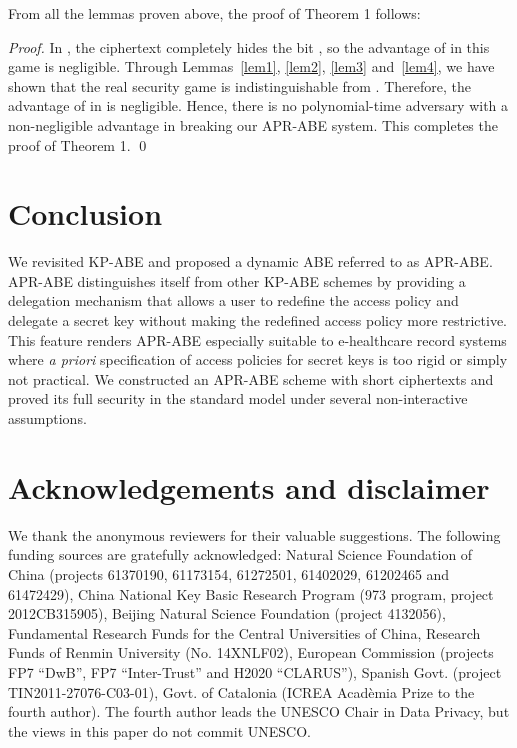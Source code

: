 \documentclass[twocolumn]{svjour3}          \smartqed  \usepackage{graphicx}
\begin{document}
From all the lemmas proven above, the proof of Theorem 1 follows:
\begin{proof}
In , the ciphertext completely hides the bit , so the advantage of  in this game is negligible. 
Through Lemmas~\ref{lem1}, \ref{lem2}, \ref{lem3} and~\ref{lem4},
we have shown that the real security game  is indistinguishable from . Therefore, the advantage of
 in  is negligible. Hence, there is no polynomial-time adversary with a non-negligible advantage in breaking our
APR-ABE system. This completes the proof of Theorem 1. \qed
\end{proof}



\section{Conclusion}
\label{conclusion}
We revisited KP-ABE and proposed a dynamic ABE  referred to as APR-ABE. APR-ABE distinguishes itself from other KP-ABE schemes by providing a delegation mechanism that allows a user to redefine the access policy and delegate a secret key without making the redefined access policy more restrictive. This feature renders APR-ABE especially suitable to e-healthcare record systems where {\em a priori} specification
of access policies for secret keys is too rigid or simply not practical.
We constructed an APR-ABE scheme with short ciphertexts and proved its full security in the standard model under several non-interactive assumptions.

\section*{Acknowledgements and disclaimer}
We thank the anonymous reviewers for their valuable suggestions.
The following funding sources are gratefully acknowledged:
Natural Science Foundation of China (projects 61370190, 61173154, 61272501, 61402029, 61202465 and 61472429), China National Key Basic Research Program (973 program, project 2012CB315905), Beijing Natural Science Foundation 
(project 4132056), Fundamental Research Funds for the Central Universities of 
China, Research Funds of Renmin University (No. 14XNLF02), European 
Commission (projects FP7 ``DwB'', FP7 ``Inter-Trust'' and H2020 ``CLARUS''), 
Spanish Govt. (project TIN2011-27076-C03-01), Govt. of Catalonia 
(ICREA Acad\`emia Prize to the fourth author). The fourth author
leads the UNESCO Chair in Data Privacy, but the views in this paper
do not commit UNESCO.  
\end{document}
